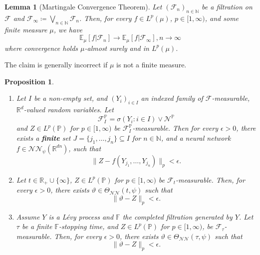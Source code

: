 \documentclass[11pt,a4paper,twoside,openany]{report}
\numberwithin{equation}{section}
\theoremstyle{plain} %
\newtheorem{proposition}[theorem]{Proposition}
\newtheorem{lemma}[theorem]{Lemma}
\theoremstyle{definition} %
\theoremstyle{remark} %
\begin{document}
\begin{lemma}[Martingale Convergence Theorem]\label{lemma:Martingale Convergence Theorem}
    Let \((\mathcal{F}_n)_{n\in\mathbb{N}}\) be a filtration on \(\mathcal{F}\) and \(\mathcal{F}_{\infty}\coloneqq\bigvee_{n\in\mathbb{N}}\mathcal{F}_n\). Then, for every \(f\in L^p(\mu)\), \(p\in[1,\infty)\), and some finite measure \(\mu\), we have
    \begin{equation*}
        \mathbb{E}_{\mu}[f|\mathcal{F}_n]\to\mathbb{E}_{\mu}[f|\mathcal{F}_{\infty}], n\to\infty
    \end{equation*}
 where convergence holds \(\mu\)-almost surely and in \(L^p(\mu)\).
\end{lemma}
The claim is generally incorrect if \(\mu\) is not a finite measure.
\begin{proposition}\label{prop:approximation of measurable maps by algorithmic strategies}
\begin{enumerate}
    \item Let \(I\) be a non-empty set, and \((Y_i)_{i\in I}\) an indexed family of \(\mathcal{F}\)-measurable, \(\mathbb{R}^d\)-valued random variables. Let 
    \begin{equation*}
        \mathcal{F}_I^{\mathbb{P}}=\sigma(Y_i:i\in I)\vee\mathcal{N}^\mathbb{P}
    \end{equation*}
    and \(Z\in L^p(\mathbb{P})\) for \(p\in[1,\infty)\) be \(\mathcal{F}_I^{\mathbb{P}}\)-measurable. Then for every \(\epsilon>0\), there exists a \textbf{finite} set \(J=\{j_1,\dots,j_n\}\subseteq I\) for \(n\in\mathbb{N}\), and a neural network \(f\in\mathcal{NN}_\psi(\mathbb{R}^{dn})\), such that 
    \begin{equation*}
        \lVert Z-f(Y_{j_1},\dots, Y_{j_n})\rVert_{p}<\epsilon.
    \end{equation*}
    \item Let  \(t\in\mathbb{R}_+\cup\{\infty\}\),  \(Z\in L^p(\mathbb{P})\) for \(p\in[1,\infty)\) be \(\mathcal{F}_t\)-measurable. Then, for every \(\epsilon>0\), there exists \(\vartheta\in\Theta_{\mathcal{NN}}(t,\psi)\) such that 
    \begin{equation*}
        \lVert \vartheta-Z\rVert_{p}<\epsilon.
    \end{equation*}
    \item Assume \(Y\) is a Lévy process and \(\mathbb{F}\) the completed filtration generated by \(Y\). Let \(\tau\) be a finite \(\mathbb{F}\)-stopping time, and \(Z\in L^p(\mathbb{P})\) for \(p\in[1,\infty)\), be \(\mathcal{F}_{\tau}\)-measurable. Then, for every \(\epsilon>0\), there exists \(\vartheta\in\Theta_{\mathcal{NN}}(\tau,\psi)\) such that 
    \begin{equation*}
        \lVert \vartheta-Z\rVert_{p}<\epsilon.
    \end{equation*}
\end{enumerate}
\end{proposition}
\end{document}

